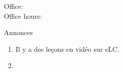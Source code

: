 \documentclass{beamer}
\subtitle[Impératifs, il y a, c'est, ce sont]{Impératifs, \lexi{il y a}, \lexi{c'est} et \lexi{ce sont}}
\begin{document}
  \begin{frame}
    \titlepage
    \tiny{Office: \\
          Office hours: }
  \end{frame}

  \begin{frame}{Annonces }
    \begin{enumerate}
      \item Il y a des leçons en vidéo sur eLC.
      \item[] 
    \end{enumerate}
  \end{frame}

\end{document}
